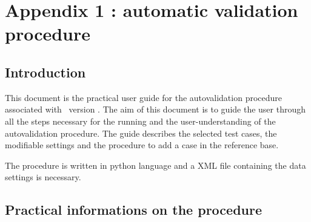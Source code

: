%
%
%
%
%
%
%
%
\section{Appendix 1 : automatic validation procedure}
\label{prg_autovalid}
\subsection{Introduction}

This document is the practical user guide for the autovalidation
procedure associated with \CS\ version \verscs.
The aim of this document is to guide the user through all the steps
necessary for the running and the user-understanding of the autovalidation
procedure.
The guide describes the selected test cases, the modifiable settings
and the procedure to add a case in the reference base.

The procedure is written in python language and a XML file containing the
data settings is necessary.

\subsection{Practical informations on the procedure}

